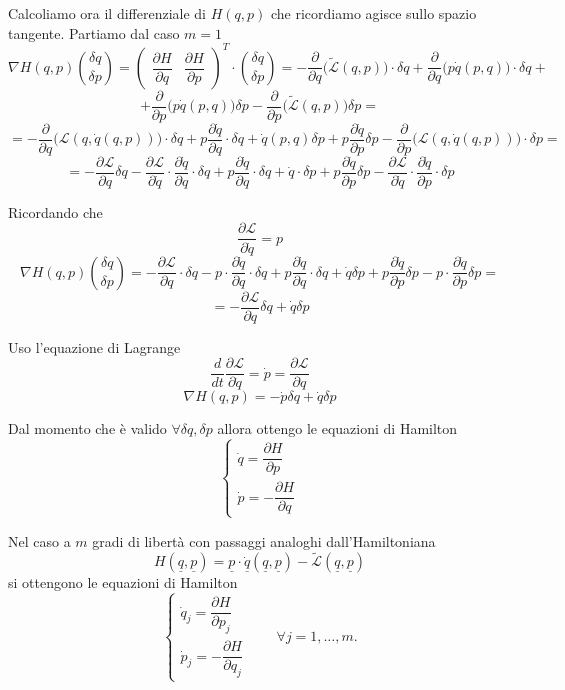 Calcoliamo ora il differenziale di \(H(q,p)\) che ricordiamo agisce sullo spazio tangente.
Partiamo dal caso \(m=1\)
\[
\nabla H(q,p)
\binom{\delta q}{\delta p}
=
\begin{pmatrix}
\dfrac{\partial H}{\partial q} & \dfrac{\partial H}{\partial p}
\end{pmatrix}^{T}
\cdot
\binom{\delta q}{\delta p}
=
-\frac{\partial}{\partial q}\bigl(\tilde{\mathcal{L}}(q,p)\bigr)\cdot\delta q
+
\frac{\partial}{\partial q}\bigl(p\dot q(p,q)\bigr)\cdot\delta q
+
\]
\[
+
\frac{\partial}{\partial p}\bigl(p\dot q(p,q)\bigr)\delta p
-
\frac{\partial}{\partial p}\bigl(\tilde{\mathcal{L}}(q,p)\bigr)\delta p
=
\]
\[
=
-\frac{\partial}{\partial q}\bigl(\mathcal{L}(q,\dot q(q,p))\bigr)\cdot\delta q
+
p\frac{\partial \dot q}{\partial q}\cdot\delta q
+
\dot q(p,q)\delta p
+
p\frac{\partial \dot q}{\partial p}\delta p
-
\frac{\partial}{\partial p}\bigl(\mathcal{L}(q,\dot q(q,p))\bigr)\cdot\delta p
=
\]
\[
=
-\frac{\partial\mathcal{L}}{\partial q}\delta q
-
\frac{\partial\mathcal{L}}{\partial \dot q}\cdot
\frac{\partial\dot q}{\partial q}\cdot\delta q
+
p\frac{\partial\dot q}{\partial q}\cdot\delta q
+
\dot q\cdot\delta p
+
p\frac{\partial\dot q}{\partial p}\delta p
-
\frac{\partial\mathcal{L}}{\partial \dot q}\cdot
\frac{\partial\dot q}{\partial p}\cdot\delta p
\]

Ricordando che
\[
\frac{\partial\mathcal{L}}{\partial \dot q}=p
\]
\[
\nabla H(q,p)
\binom{\delta q}{\delta p}
=
-\frac{\partial\mathcal{L}}{\partial q}\cdot\delta q
-
p\cdot\frac{\partial\dot q}{\partial q}\cdot\delta q
+
p\frac{\partial\dot q}{\partial q}\cdot\delta q
+
\dot q\delta p
+
p\frac{\partial\dot q}{\partial p}\delta p
-
p\cdot\frac{\partial\dot q}{\partial p}\delta p
=
\]
\[
=
-\frac{\partial\mathcal{L}}{\partial q}\delta q
+
\dot q\delta p
\]

Uso l'equazione di Lagrange
\[
\frac{d}{dt}\frac{\partial\mathcal{L}}{\partial \dot q}
=
\dot p
=
\frac{\partial\mathcal{L}}{\partial q}
\]
\[
\nabla H(q,p)
=
-\dot p\delta q+\dot q\delta p
\]

Dal momento che è valido \(\forall \delta q,\delta p\) allora ottengo le equazioni di Hamilton
\[
\begin{cases}
\dot q=\dfrac{\partial H}{\partial p}\\[6pt]
\dot p=-\dfrac{\partial H}{\partial q}
\end{cases}
\]


Nel caso a \(m\) gradi di libertà con passaggi analoghi dall'Hamiltoniana
\[
H(\underline q,\underline p)
=
\underline p\cdot \dot{\underline q}(\underline q,\underline p)
-
\tilde{\mathcal{L}}(\underline q,\underline p)
\]
si ottengono le equazioni di Hamilton
\[
\begin{cases}
\dot q_j=\dfrac{\partial H}{\partial p_j}\\[6pt]
\dot p_j=-\dfrac{\partial H}{\partial q_j}
\end{cases}
\qquad
\forall j=1,\ldots,m.
\]

